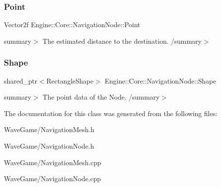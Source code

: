 \subsubsection{\texorpdfstring{Point}{Point}}
{\footnotesize\ttfamily Vector2f Engine\+::\+Core\+::\+Navigation\+Node\+::\+Point}

summary$>$ The estimated distance to the destination. /summary$>$ \mbox{\label{struct_engine_1_1_core_1_1_navigation_node_a7a1470734947944ba351df516e2a7cc1}} 
\subsubsection{\texorpdfstring{Shape}{Shape}}
{\footnotesize\ttfamily shared\+\_\+ptr$<$Rectangle\+Shape$>$ Engine\+::\+Core\+::\+Navigation\+Node\+::\+Shape}

summary$>$ The point data of the Node. /summary$>$ 

The documentation for this class was generated from the following files\+:\begin{DoxyCompactItemize}
\item 
Wave\+Game/Navigation\+Mesh.\+h\item 
Wave\+Game/Navigation\+Node.\+h\item 
Wave\+Game/Navigation\+Mesh.\+cpp\item 
Wave\+Game/Navigation\+Node.\+cpp\end{DoxyCompactItemize}
